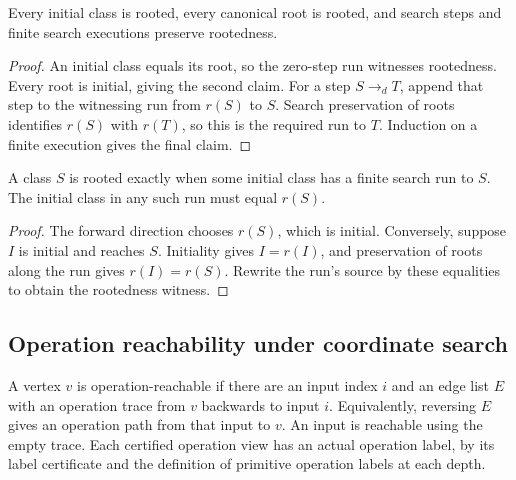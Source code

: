 \begin{theorem}
Every initial class is rooted, every canonical root is rooted, and search
steps and finite search executions preserve rootedness.
\end{theorem}
\begin{proof}
An initial class equals its root, so the zero-step run witnesses rootedness.
Every root is initial, giving the second claim. For a step $S\longrightarrow_d T$,
append that step to the witnessing run from $r(S)$ to $S$. Search preservation
of roots identifies $r(S)$ with $r(T)$, so this is the required run to $T$.
Induction on a finite execution gives the final claim.
\end{proof}

\begin{theorem}
A class $S$ is rooted exactly when some initial class has a finite search run
to $S$. The initial class in any such run must equal $r(S)$.
\end{theorem}
\begin{proof}
The forward direction chooses $r(S)$, which is initial. Conversely, suppose
$I$ is initial and reaches $S$. Initiality gives $I=r(I)$, and preservation
of roots along the run gives $r(I)=r(S)$. Rewrite the run's source by these
equalities to obtain the rootedness witness.
\end{proof}

\subsection{Operation reachability under coordinate search}
\begin{definition}
A vertex $v$ is operation-reachable if there are an input index $i$ and an
edge list $E$ with an operation trace from $v$ backwards to input $i$.
Equivalently, reversing $E$ gives an operation path from that input to $v$.
An input is reachable using the empty trace. Each certified operation view
has an actual operation label, by its label certificate and the definition
of primitive operation labels at each depth.
\end{definition}


